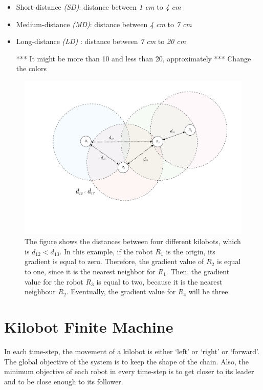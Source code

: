 \documentclass[11pt,a4paper]{article}
\begin{document}
\begin{itemize}
    \item Short-distance \textit{(SD)}: distance between \textit{1 cm} to \textit{4 cm}
    \item Medium-distance \textit{(MD)}: distance between \textit{4 cm} to \textit{7 cm}
    \item Long-distance \textit{(LD)} : distance between \textit{7 cm} to \textit{20 cm} 
   
    *** It might be more than 10 and less than 20, approximately
    *** Change the colors 
    
\end{itemize}
 \begin{figure}[h]
     \centering
 \includegraphics[scale=0.4]{Figs/PropagationArea_BW.pdf}
     \caption{ The figure shows the distances between four different kilobots, which is \(d_{12}<d_{13}\). In this example, if the robot $R_1$ is the origin, its gradient is equal to zero.  Therefore, the gradient value of $R_2$ is equal to one, since it is the nearest neighbor for $R_1$. Then, the gradient value for the robot $R_3$ is equal to two, because it is the nearest neighbour $R_2$. Eventually, the gradient value for $R_4$ will be three.  }
     \label{fig:propagation}
  \end{figure}
\section {Kilobot Finite Machine }
In each time-step, the movement of a kilobot is either `left' or `right' or `forward'. The global objective of the system is to keep the shape of the chain. Also, the minimum objective of each robot in every time-step is to get closer to its leader and to be close enough to its follower.  
\end{document}
